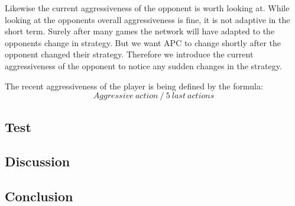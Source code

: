 Likewise the current aggressiveness of the opponent is worth looking at. While looking at the opponents overall aggressiveness is fine, it is not adaptive in the short term. Surely after many games the network will have adapted to the opponents change in strategy. But we want APC to change shortly after the opponent changed their strategy. Therefore we introduce the current aggressiveness of the opponent to notice any sudden changes in the strategy.

The recent aggressiveness of the player is being defined by the formula:
\[ Aggressive ~ action ~ / ~ 5 ~ last ~ actions \]



\subsection{Test}


\subsection{Discussion}

\subsection{Conclusion}

